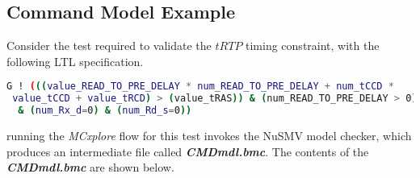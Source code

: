 \subsection{Command Model Example}
Consider the test required to validate the $tRTP$ timing constraint, with the following LTL specification.
\begin{lstlisting}[language=bash]
G ! (((value_READ_TO_PRE_DELAY * num_READ_TO_PRE_DELAY + num_tCCD *
 value_tCCD + value_tRCD) > (value_tRAS)) & (num_READ_TO_PRE_DELAY > 0)
  & (num_Rx_d=0) & (num_Rd_s=0))
\end{lstlisting}
running the \textit{MCxplore} flow for this test invokes the NuSMV model checker, which produces an intermediate file called \textbf{\textit{CMDmdl.bmc}}. 
The contents of the  \textbf{\textit{CMDmdl.bmc}} are shown below.

